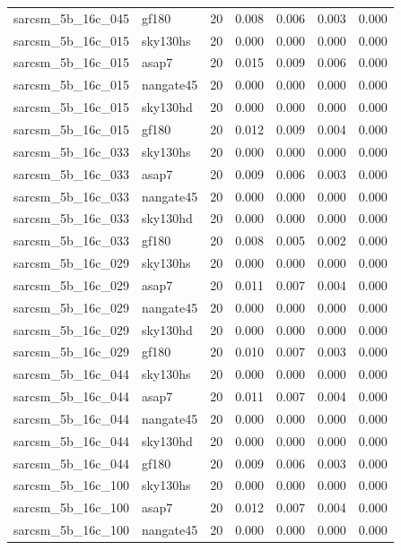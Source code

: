 \begin{tabular}{llrrrrr}
sarcsm\_5b\_16c\_045 & gf180 & 20 & 0.008 & 0.006 & 0.003 & 0.000 \\
sarcsm\_5b\_16c\_015 & sky130hs & 20 & 0.000 & 0.000 & 0.000 & 0.000 \\
sarcsm\_5b\_16c\_015 & asap7 & 20 & 0.015 & 0.009 & 0.006 & 0.000 \\
sarcsm\_5b\_16c\_015 & nangate45 & 20 & 0.000 & 0.000 & 0.000 & 0.000 \\
sarcsm\_5b\_16c\_015 & sky130hd & 20 & 0.000 & 0.000 & 0.000 & 0.000 \\
sarcsm\_5b\_16c\_015 & gf180 & 20 & 0.012 & 0.009 & 0.004 & 0.000 \\
sarcsm\_5b\_16c\_033 & sky130hs & 20 & 0.000 & 0.000 & 0.000 & 0.000 \\
sarcsm\_5b\_16c\_033 & asap7 & 20 & 0.009 & 0.006 & 0.003 & 0.000 \\
sarcsm\_5b\_16c\_033 & nangate45 & 20 & 0.000 & 0.000 & 0.000 & 0.000 \\
sarcsm\_5b\_16c\_033 & sky130hd & 20 & 0.000 & 0.000 & 0.000 & 0.000 \\
sarcsm\_5b\_16c\_033 & gf180 & 20 & 0.008 & 0.005 & 0.002 & 0.000 \\
sarcsm\_5b\_16c\_029 & sky130hs & 20 & 0.000 & 0.000 & 0.000 & 0.000 \\
sarcsm\_5b\_16c\_029 & asap7 & 20 & 0.011 & 0.007 & 0.004 & 0.000 \\
sarcsm\_5b\_16c\_029 & nangate45 & 20 & 0.000 & 0.000 & 0.000 & 0.000 \\
sarcsm\_5b\_16c\_029 & sky130hd & 20 & 0.000 & 0.000 & 0.000 & 0.000 \\
sarcsm\_5b\_16c\_029 & gf180 & 20 & 0.010 & 0.007 & 0.003 & 0.000 \\
sarcsm\_5b\_16c\_044 & sky130hs & 20 & 0.000 & 0.000 & 0.000 & 0.000 \\
sarcsm\_5b\_16c\_044 & asap7 & 20 & 0.011 & 0.007 & 0.004 & 0.000 \\
sarcsm\_5b\_16c\_044 & nangate45 & 20 & 0.000 & 0.000 & 0.000 & 0.000 \\
sarcsm\_5b\_16c\_044 & sky130hd & 20 & 0.000 & 0.000 & 0.000 & 0.000 \\
sarcsm\_5b\_16c\_044 & gf180 & 20 & 0.009 & 0.006 & 0.003 & 0.000 \\
sarcsm\_5b\_16c\_100 & sky130hs & 20 & 0.000 & 0.000 & 0.000 & 0.000 \\
sarcsm\_5b\_16c\_100 & asap7 & 20 & 0.012 & 0.007 & 0.004 & 0.000 \\
sarcsm\_5b\_16c\_100 & nangate45 & 20 & 0.000 & 0.000 & 0.000 & 0.000 \\

\end{tabular}
